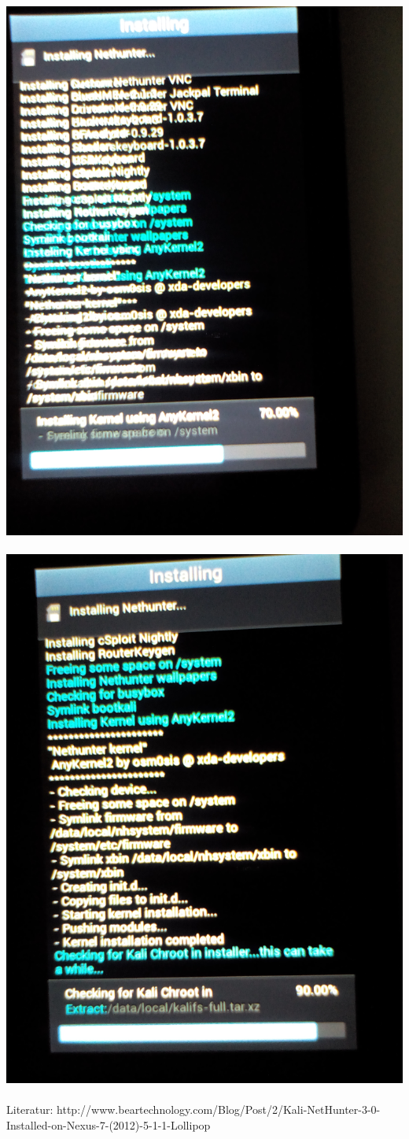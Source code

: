 \documentclass[11pt,a4paper]{article}
\begin{document}
\includegraphics[scale=0.09]{./Image/img18} \\ \\
\includegraphics[scale=0.09]{./Image/img19} \\ \\


Literatur: http://www.beartechnology.com/Blog/Post/2/Kali-NetHunter-3-0-Installed-on-Nexus-7-(2012)-5-1-1-Lollipop
\end{document}
